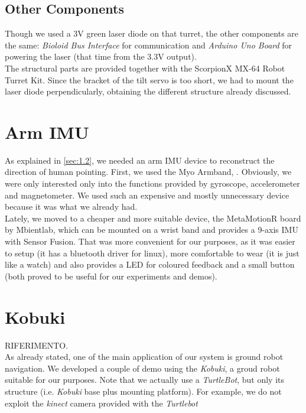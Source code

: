 \subsection{Other Components}
Though we used a 3V green laser diode on that turret, the other components are the same: \emph{Bioloid Bus Interface} for communication and \emph{Arduino Uno Board} for powering the laser (that time from the 3.3V output).\\
The structural parts are provided together with the ScorpionX MX-64 Robot Turret Kit. Since the bracket of the tilt servo is too short, we had to mount the laser diode perpendicularly, obtaining the different structure already discussed.
\section{Arm IMU}
As explained in \ref{sec:1.2}, we needed an arm IMU device to reconstruct the direction of human pointing. First, we used the Myo Armband, . Obviously, we were only interested only into the functions provided by gyroscope, accelerometer and magnetometer. We used such an expensive and mostly unnecessary device because it was what we already had.\\ Lately, we moved to a cheaper and more suitable device, the MetaMotionR board by Mbientlab, which can be mounted on a wrist band and provides a 9-axis IMU with Sensor Fusion. That was more convenient for our purposes, as it was easier to setup (it has a bluetooth driver for linux), more comfortable to wear (it is just like a watch) and also provides a LED for coloured feedback and a small button (both proved to be useful for our experiments and demos).
\section{Kobuki}
 RIFERIMENTO.\\
As already stated, one of the main application of our system is ground robot navigation. We developed a couple of demo using the \emph{Kobuki}, a groud robot suitable for our purposes. Note that we actually use a \emph{TurtleBot}, but only its structure (i.e. \emph{Kobuki} base plus mounting platform). For example, we do not exploit the \emph{kinect} camera provided with the \emph{Turtlebot}
